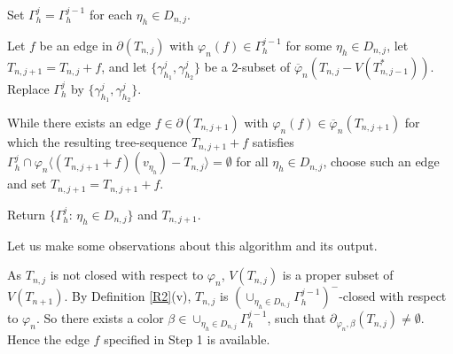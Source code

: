 \documentclass[11pt]{article}
\newcommand{\phibar}{\overline{\varphi}}
\begin{document}
\vskip 3mm
\vskip 2mm
 Set $\Gamma^{j}_h =\Gamma^{j-1}_h$ for each $\eta_h\in D_{n, j}$.


\vskip 2mm
  Let $f$ be an edge in $\partial(T_{n,j})$ with $\varphi_n(f) \in \Gamma^{j-1}_h$ for some 
$\eta_h\in D_{n,j}$, let $T_{n,j+1}=T_{n,j}+f$, and let $\{\gamma^{j}_{h_1},\gamma^{j}_{h_2}\}$ be a 2-subset of $\phibar_n(T_{n,j}-V(T_{n,j-1}^*))$. Replace $\Gamma^{j}_h$ by $\{\gamma^{j}_{h_1},\gamma^{j}_{h_2}\}$.

\vskip 2mm
 While there exists an edge $f\in\partial(T_{n,j+1})$ with $\varphi_n(f)\in\phibar_n(T_{n,j+1})$ for which the resulting tree-sequence $T_{n,j+1}+f$ satisfies 
$\Gamma^{j}_h \cap \varphi_n \langle (T_{n,j+1}+f)(v_{\eta_h})-T_{n,j} \rangle =\emptyset$ for all $\eta_h\in D_{n,j}$, choose such an edge and set $T_{n,j+1}=T_{n,j+1}+f$. 

\vskip 2mm
 Return $\{\Gamma^{j}_h:\, \eta_h\in D_{n,j}\}$ and $T_{n,j+1}$. 


\vskip 2mm
Let us make some observations about this algorithm and its output. 

As $T_{n,j}$ is not closed with respect to $\varphi_n$, $V(T_{n,j})$ is a proper subset of $V(T_{n+1})$. By  Definition 
\ref{R2}(v), $T_{n,j}$ is $(\cup_{\eta_h\in D_{n,j}}\Gamma^{j-1}_h)^-$-closed with respect to $\varphi_n$.
So there exists a color $\beta \in \cup_{\eta_h\in D_{n,j}}\Gamma^{j-1}_h$, such that $\partial_{\varphi_n, \beta}(T_{n,j}) \ne \emptyset$. Hence the edge $f$ specified in Step 1 is available. 
\end{document}
